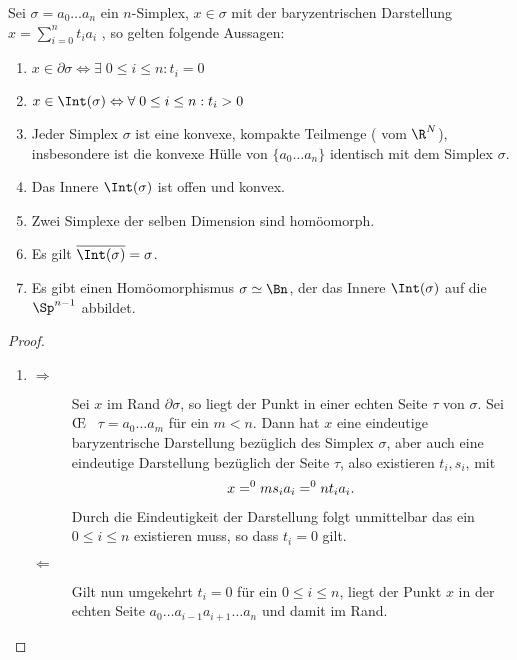 \begin{Satz}
  \normalfont Sei $\sigma = a_0 \ldots a_n $ ein $n$-Simplex,
  $x \in \sigma$ mit der baryzentrischen Darstellung
  $x=\sum\limits_{i=0}^n t_i a_i$ , so gelten folgende Aussagen:
  \begin{enumerate}[$(a)$]
  \item
    $x \in \partial\sigma \Leftrightarrow \exists \; 0 \leq i \leq n :
    t_i = 0$
  \item \label{satz:a}
    $x \in \Int(\sigma) \Leftrightarrow \forall \; 0 \leq i \leq n :
    t_i > 0$
  \item Jeder Simplex $\sigma$ ist eine konvexe, kompakte Teilmenge (
    vom $\R^N$), insbesondere ist die konvexe Hülle von
    $\{ a_0 \ldots a_n \}$ identisch mit dem Simplex $\sigma$.
  \item Das Innere $\Int(\sigma)$ ist offen und konvex.
  \item Zwei Simplexe der selben Dimension sind homöomorph.
  \item Es gilt $\overline{\Int(\sigma)} = \sigma$.
  \item Es gibt einen Homöomorphismus $\sigma \simeq \Bn$, der das
    Innere $\Int(\sigma)$ auf die $\Sp^{n-1}$ abbildet.
  \end{enumerate}
  \begin{proof}
    \begin{enumerate}[$a)$:]
    \item
      \begin{description}
      \item[\glqq $\Rightarrow$\grqq] Sei $x$ im Rand
        $\partial\sigma$, so liegt der Punkt in einer echten Seite
        $\tau$ von $\sigma$. Sei \OE~ $\tau = a_0 \ldots a_m$ für ein
        $m < n$. Dann hat $x$ eine eindeutige baryzentrische
        Darstellung bezüglich des Simplex $\sigma$, aber auch eine
        eindeutige Darstellung bezüglich der Seite $\tau$, also
        existieren $t_i,s_i$, mit
        \begin{gather*}
          x = \sp{0}{m} s_i a_i = \sp{0}{n} t_i a_i .
        \end{gather*}
        Durch die Eindeutigkeit der Darstellung folgt unmittelbar das
        ein $0 \leq i \leq n$ existieren muss, so dass $t_i = 0$ gilt.
      \item[\glqq $\Leftarrow$ \grqq] Gilt nun umgekehrt $t_i = 0$ für
        ein $0 \leq i \leq n$, liegt der Punkt $x$ in der echten Seite
        $a_0 \ldots a_{i-1} a_{i+1} \ldots a_n$ und damit im Rand.
      \end{description}


\end{enumerate}
\end{proof}
\end{Satz}
